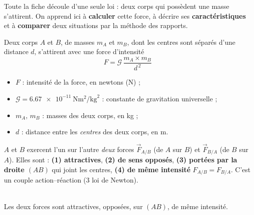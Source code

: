 \documentclass[11pt,a4paper]{article}
\newcommand{\vv}[1]{\vec{#1}}\newcommand{\ds}{\displaystyle}
\begin{document}

Toute la fiche découle d'une seule loi : deux corps qui possèdent une masse
s'attirent. On apprend ici à \textbf{calculer} cette force, à décrire ses
\textbf{caractéristiques} et à \textbf{comparer} deux situations par la méthode
des rapports.

\begin{cle}
Deux corps $A$ et $B$, de masses $m_A$ et $m_B$, dont les centres sont séparés
d'une distance $d$, s'attirent avec une force d'intensité
\[
\boxed{\,F=\mathcal{G}\,\dfrac{m_A\times m_B}{d^{\,2}}\,}
\]
\begin{itemize}[leftmargin=1.5em,topsep=1pt,itemsep=0pt]
  \item $F$ : intensité de la force, en newtons (\si{\newton}) ;
  \item $\mathcal{G}=\num{6.67e-11}\ \si{\newton\metre\squared\per\kilogram\squared}$ :
        constante de gravitation universelle ;
  \item $m_A,\,m_B$ : masses des deux corps, en \si{\kilogram} ;
  \item $d$ : distance entre les \emph{centres} des deux corps, en \si{\metre}.
\end{itemize}
\end{cle}

\begin{cle}
$A$ et $B$ exercent l'un sur l'autre \emph{deux} forces $\vv{F}_{A/B}$ (de $A$ sur $B$)
et $\vv{F}_{B/A}$ (de $B$ sur $A$). Elles sont :
\textbf{(1) attractives}, \textbf{(2) de sens opposés}, \textbf{(3) portées par la
droite $(AB)$} qui joint les centres, \textbf{(4) de même intensité}
$F_{A/B}=F_{B/A}$. C'est un couple action--réaction (3 loi de Newton).
\end{cle}

\begin{center}
\\[-1pt]
{\footnotesize Les deux forces sont attractives, opposées, sur $(AB)$, de même
intensité.}
\end{center}
\end{document}
